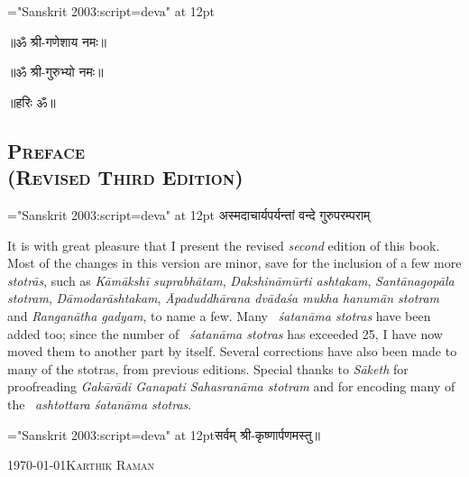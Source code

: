 {\font \x="Sanskrit 2003:script=deva" at 12pt\x
\centerline{॥ॐ श्री-गणेशाय नमः॥}
\centerline{॥ॐ श्री-गुरुभ्यो नमः॥}
\centerline{॥हरिः ॐ॥}
}
\thispagestyle{empty}

\begin{center}
\chapter*{\texorpdfstring{\scshape{Preface\\(Revised Third Edition)}}{Preface\\(Revised Third Edition)}}
\end{center}

{\font \x="Sanskrit 2003:script=deva" at 12pt\x
{}
{अस्मदाचार्यपर्यन्तां वन्दे गुरुपरम्पराम्}
}

It is with great pleasure that I present the revised \emph{second} edition of this book. Most of the changes in this version are minor, save for the inclusion of a few more \emph{stotrās}, such as \textit{Kāmākshī suprabhātam}, \textit{Dakshināmūrti ashtakam}, \textit{Santānagopāla stotram}, \textit{Dāmodarāshtakam}, \textit{Āpaduddhārana  dvādaśa mukha hanu\-mān stotram} and \textit{Ranganātha gadyam}, to name a few. Many ~\textit{śatanāma stotras} have been added too; since the number of ~\textit{śatanāma stotras} has exceeded 25, I have now moved them to another part by itself. Several corrections have also been made to many of the stotras, from previous editions. Special thanks to \textit{Sāketh} for proofreading \textit{Gakārādi Ganapati Sahasranāma stotram} and for encoding many of the ~\textit{ashtottara śatanāma stotras}.\\ 



\centerline{\font \x="Sanskrit 2003:script=deva" at 12pt\x सर्वम् श्री-कृष्णार्पणमस्तु॥}

\medskip
\noindent\today \hfill \textsc{Karthik Raman}
